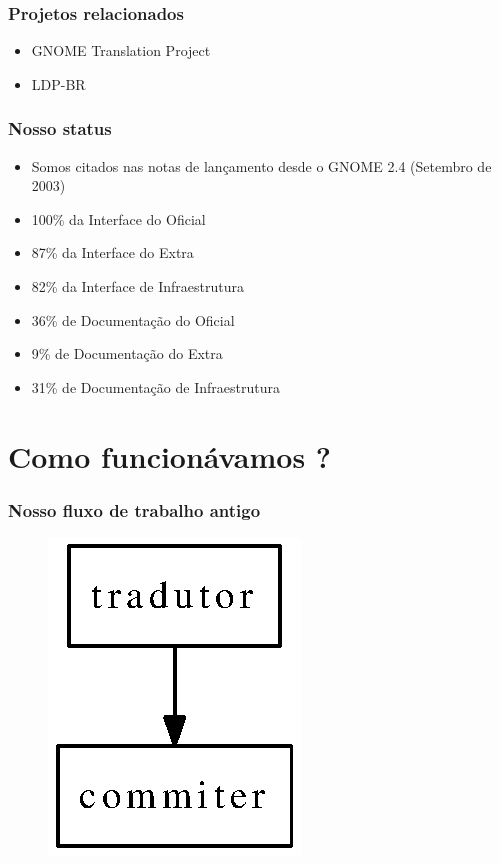 \documentclass{beamer}
\begin{document}
\begin{frame}
  \frametitle{Projetos relacionados}
  \begin{itemize}
    \item GNOME Translation Project
    \item LDP-BR
  \end{itemize}
\end{frame}

\begin{frame}
    \frametitle[Para o GNOME 2.28]{Nosso status}    
    \begin{itemize}[<+->]
        \item \color[rgb]{0,1,0}   Somos citados nas notas de lançamento desde o GNOME 2.4 (Setembro de 2003)  
        \item \color[rgb]{0,1,0}  100\% da Interface do Oficial 
        \item \color[rgb]{0,1,0}  87\% da Interface do Extra
        \item \color[rgb]{0,1,0}  82\% da Interface de Infraestrutura
        \item \color[rgb]{1,0,0} 36\% de Documentação do Oficial
        \item \color[rgb]{1,0,0} 9\%  de Documentação do Extra
        \item \color[rgb]{1,0,0} 31\% de Documentação de Infraestrutura
    \end{itemize}

\end{frame}

\section{Como funcionávamos ?}

\begin{frame}
    \frametitle{Nosso fluxo de trabalho antigo}
    \begin{figure}[ht]
        \includegraphics{figures/fluxo_antigo.eps}     
    \end{figure}
\end{frame}
\end{document}
